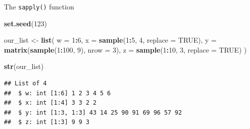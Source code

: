 \documentclass[ignorenonframetext,]{beamer}
\newenvironment{Shaded}{\begin{snugshade}}{\end{snugshade}}
\newcommand{\DataTypeTok}[1]{\textcolor[rgb]{0.13,0.29,0.53}{#1}}
\newcommand{\DecValTok}[1]{\textcolor[rgb]{0.00,0.00,0.81}{#1}}
\newcommand{\KeywordTok}[1]{\textcolor[rgb]{0.13,0.29,0.53}{\textbf{#1}}}
\newcommand{\NormalTok}[1]{#1}
\newcommand{\OperatorTok}[1]{\textcolor[rgb]{0.81,0.36,0.00}{\textbf{#1}}}
\newcommand{\OtherTok}[1]{\textcolor[rgb]{0.56,0.35,0.01}{#1}}
\newcommand{\StringTok}[1]{\textcolor[rgb]{0.31,0.60,0.02}{#1}}
\begin{document}
\begin{frame}[fragile]{The \texttt{sapply()} function}
\protect\hypertarget{the-sapply-function-1}{}

\begin{Shaded}
\begin{Highlighting}[]
\KeywordTok{set.seed}\NormalTok{(}\DecValTok{123}\NormalTok{)}

\NormalTok{our_list <-}\StringTok{ }\KeywordTok{list}\NormalTok{(}
  \DataTypeTok{w =} \DecValTok{1}\OperatorTok{:}\DecValTok{6}\NormalTok{,}
  \DataTypeTok{x =} \KeywordTok{sample}\NormalTok{(}\DecValTok{1}\OperatorTok{:}\DecValTok{5}\NormalTok{, }\DecValTok{4}\NormalTok{, }\DataTypeTok{replace =} \OtherTok{TRUE}\NormalTok{),}
  \DataTypeTok{y =} \KeywordTok{matrix}\NormalTok{(}\KeywordTok{sample}\NormalTok{(}\DecValTok{1}\OperatorTok{:}\DecValTok{100}\NormalTok{, }\DecValTok{9}\NormalTok{), }\DataTypeTok{nrow =} \DecValTok{3}\NormalTok{),}
  \DataTypeTok{z =} \KeywordTok{sample}\NormalTok{(}\DecValTok{1}\OperatorTok{:}\DecValTok{10}\NormalTok{, }\DecValTok{3}\NormalTok{, }\DataTypeTok{replace =} \OtherTok{TRUE}\NormalTok{) }
\NormalTok{)}

\KeywordTok{str}\NormalTok{(our_list)}
\end{Highlighting}
\end{Shaded}

\begin{verbatim}
## List of 4
##  $ w: int [1:6] 1 2 3 4 5 6
##  $ x: int [1:4] 3 3 2 2
##  $ y: int [1:3, 1:3] 43 14 25 90 91 69 96 57 92
##  $ z: int [1:3] 9 9 3
\end{verbatim}

\end{frame}
\end{document}
